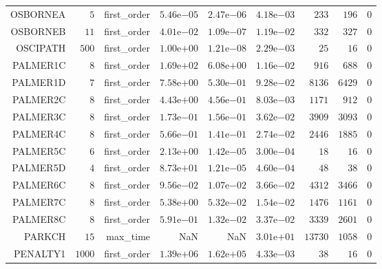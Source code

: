 \begin{longtable}{rrrrrrrrr}
OSBORNEA & \(     5\) & first\_order & \( 5.46\)e\(-05\) & \( 2.47\)e\(-06\) & \( 4.18\)e\(-03\) & \(   233\) & \(   196\) & \(     0\) \\
OSBORNEB & \(    11\) & first\_order & \( 4.01\)e\(-02\) & \( 1.09\)e\(-07\) & \( 1.19\)e\(-02\) & \(   332\) & \(   327\) & \(     0\) \\
OSCIPATH & \(   500\) & first\_order & \( 1.00\)e\(+00\) & \( 1.21\)e\(-08\) & \( 2.29\)e\(-03\) & \(    25\) & \(    16\) & \(     0\) \\
PALMER1C & \(     8\) & first\_order & \( 1.69\)e\(+02\) & \( 6.08\)e\(+00\) & \( 1.16\)e\(-02\) & \(   916\) & \(   688\) & \(     0\) \\
PALMER1D & \(     7\) & first\_order & \( 7.58\)e\(+00\) & \( 5.30\)e\(-01\) & \( 9.28\)e\(-02\) & \(  8136\) & \(  6429\) & \(     0\) \\
PALMER2C & \(     8\) & first\_order & \( 4.43\)e\(+00\) & \( 4.56\)e\(-01\) & \( 8.03\)e\(-03\) & \(  1171\) & \(   912\) & \(     0\) \\
PALMER3C & \(     8\) & first\_order & \( 1.73\)e\(-01\) & \( 1.56\)e\(-01\) & \( 3.62\)e\(-02\) & \(  3909\) & \(  3093\) & \(     0\) \\
PALMER4C & \(     8\) & first\_order & \( 5.66\)e\(-01\) & \( 1.41\)e\(-01\) & \( 2.74\)e\(-02\) & \(  2446\) & \(  1885\) & \(     0\) \\
PALMER5C & \(     6\) & first\_order & \( 2.13\)e\(+00\) & \( 1.42\)e\(-05\) & \( 3.00\)e\(-04\) & \(    18\) & \(    16\) & \(     0\) \\
PALMER5D & \(     4\) & first\_order & \( 8.73\)e\(+01\) & \( 1.21\)e\(-05\) & \( 4.60\)e\(-04\) & \(    48\) & \(    38\) & \(     0\) \\
PALMER6C & \(     8\) & first\_order & \( 9.56\)e\(-02\) & \( 1.07\)e\(-02\) & \( 3.66\)e\(-02\) & \(  4312\) & \(  3466\) & \(     0\) \\
PALMER7C & \(     8\) & first\_order & \( 5.38\)e\(+00\) & \( 5.32\)e\(-02\) & \( 1.54\)e\(-02\) & \(  1476\) & \(  1161\) & \(     0\) \\
PALMER8C & \(     8\) & first\_order & \( 5.91\)e\(-01\) & \( 1.32\)e\(-02\) & \( 3.37\)e\(-02\) & \(  3339\) & \(  2601\) & \(     0\) \\
PARKCH & \(    15\) & max\_time &       NaN &       NaN & \( 3.01\)e\(+01\) & \( 13730\) & \(  1058\) & \(     0\) \\
PENALTY1 & \(  1000\) & first\_order & \( 1.39\)e\(+06\) & \( 1.62\)e\(+05\) & \( 4.33\)e\(-03\) & \(    38\) & \(    16\) & \(     0\) \\

\end{longtable}
